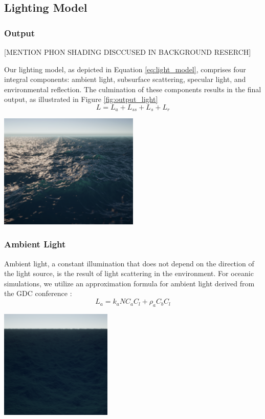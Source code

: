 \subsection{Lighting Model}

\subsubsection{Output}
[MENTION PHON SHADING DISCCUSED IN BACKGROUND RESERCH]

Our lighting model, as depicted in Equation \ref{eq:light_model}, comprises four integral components: ambient light, subsurface scattering, specular light, and environmental reflection. The culmination of these components results in the final output, as illustrated in Figure \ref{fig:output_light}
\begin{equation}
    L = L_a + L_{ss} + L_s + L_r
    \label{eq:light_model}
\end{equation}
\begin{minipage}{1\textwidth}
    \centering
    \includegraphics[width=0.50\textwidth]{"images/output_light.png"}
    \label{fig:output_light}
\end{minipage}

\subsubsection{Ambient Light}
Ambient light, a constant illumination that does not depend on the direction of the light source, is the result of light scattering in the environment. For oceanic simulations, we utilize an approximation formula for ambient light derived from the GDC conference \cite{mark2021}: 
\begin{equation}
    L_a = k_a N C_a C_l + \rho_a C_b C_l
\end{equation}
\begin{minipage}{1\textwidth}
    \centering
    \includegraphics[width=0.40\textwidth]{"images/ambient_light.png"}
    \label{fig:ambient_light}
\end{minipage}


